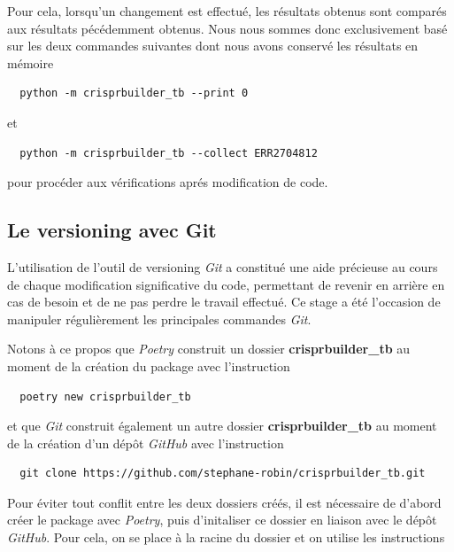 \documentclass[twoside,a4paper,11pt,frenchb,openany]{report}
\begin{document}
Pour cela, lorsqu'un changement est effectué, les résultats obtenus sont comparés aux résultats pécédemment obtenus. Nous nous sommes donc exclusivement basé sur les deux commandes suivantes dont nous avons conservé les résultats en mémoire

\begin{verbatim}  python -m crisprbuilder_tb --print 0\end{verbatim}

et 

\begin{verbatim}  python -m crisprbuilder_tb --collect ERR2704812\end{verbatim}

pour procéder aux vérifications aprés modification de code.



\subsection{Le versioning avec Git}

L'utilisation de l'outil de versioning \textit{Git} a constitué une aide précieuse au cours de chaque modification significative du code, permettant de revenir en arrière en cas de besoin et de ne pas perdre le travail effectué. Ce stage a été l'occasion de manipuler régulièrement les principales commandes \textit{Git}. 

Notons à ce propos que \textit{Poetry} construit un dossier \textbf{crisprbuilder\_tb} au moment de la création du package avec l'instruction

 \begin{verbatim}  poetry new crisprbuilder_tb\end{verbatim}

et que \textit{Git} construit également un autre dossier \textbf{crisprbuilder\_tb} au moment de la création d'un dépôt \textit{GitHub} avec l'instruction

\begin{verbatim}  git clone https://github.com/stephane-robin/crisprbuilder_tb.git\end{verbatim}

Pour éviter tout conflit entre les deux dossiers créés, il est nécessaire de d'abord créer le package avec \textit{Poetry}, puis d'initaliser ce dossier en liaison avec le dépôt \textit{GitHub}. Pour cela, on se place à la racine du dossier et on utilise les instructions
\end{document}
